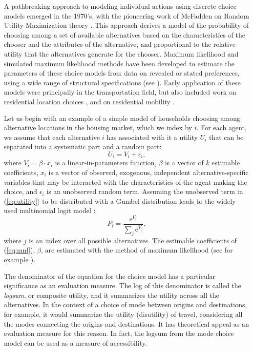 A pathbreaking approach to modeling individual actions using discrete
choice models emerged in the 1970's, with the pioneering work of
McFadden on Random Utility Maximization theory
\cite{mcfadden-1974,mcfadden-1981}. This approach derives a model of
the probability of choosing among a set of available alternatives
based on the characteristics of the chooser and the attributes of
the alternative, and proportional to the relative utility that the
alternatives generate for the chooser. Maximum likelihood and
simulated maximum likelihood methods have been developed to estimate
the parameters of these choice models from data on revealed or
stated preferences, using a wide range of structural specifications
(see \cite{train-book-2003}). Early application of these models were
principally in the transportation field, but also included work on
residential location choices
\cite{quigley-eer-1976,lerman-trr-1977,mcfadden-1978}, and
on residential mobility \cite{clark-vanlierop-1986}.

Let us begin with an example of a simple model of households choosing among
alternative locations in the housing market, which we index by
$i$. For each agent, we assume that each alternative $i$ has
associated with it a utility $U_i$ that can be separated into a
systematic part and a random part:
\begin{equation}
    U_i = V_i + \epsilon_i,
    \label{eq:utility}
\end{equation}
where $V_i = \beta\cdot {x}_i$ is a linear-in-parameters
function, $\beta$ is a vector of $k$ estimable coefficients,
$x_i$ is a vector of observed, exogenous, independent
alternative-specific variables that may be interacted with the
characteristics of the agent making the choice, and $\epsilon_i$
is an unobserved random term. Assuming the unobserved term in
(\ref{eq:utility}) to be distributed with a Gumbel distribution
leads to the  widely used multinomial logit model
\cite{mcfadden-1974,mcfadden-1981}:
\begin{equation}
    P_i = \frac{\mathrm{e}^{V_i}}{\sum_j \mathrm{e}^{V_j}},
    \label{eq:mnl}
\end{equation}
where $j$ is an index over all possible alternatives. The
estimable coefficients of (\ref{eq:mnl}), $\beta$, are
estimated with the method of maximum likelihood (see for example
\cite{greene-2002}).

The denominator of the equation for the choice model has a particular
significance as an evaluation measure.  The log of this denominator
is called the \emph{logsum}, or composite utility, and it summarizes
the utility across all the alternatives.  In the context of a choice of
mode between origins and destinations, for example, it would summarize
the utility (disutility) of travel, considering all the modes connecting the
origins and destinations.  It has theoretical appeal as an evaluation
measure for this reason.  In fact, the logsum from the mode choice
model can be used as a measure of accessibility.

